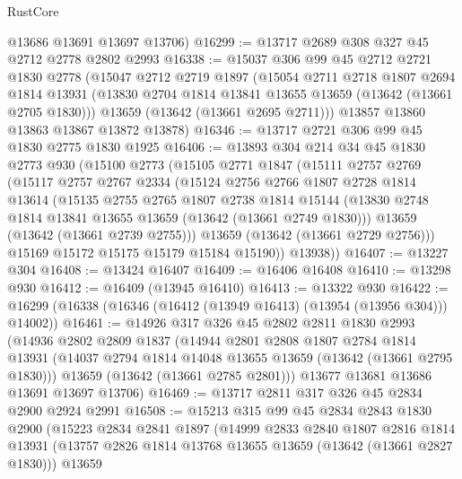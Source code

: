 \begin{lexlean}{RustCore}
\begin{coremodule}
      @13686
      @13691
      @13697
      @13706)
@16299 := @13717 @2689 @308 @327 @45 @2712 @2778 @2802 @2993
@16338 := @15037
    @306
    @99
    @45
    @2712
    @2721
    @1830
    @2778
    (@15047
      @2712
      @2719
      @1897
      (@15054
        @2711
        @2718
        @1807
        @2694
        @1814
        @13931
        (@13830 @2704 @1814 @13841 @13655 @13659 (@13642 (@13661 @2705 @1830)))
        @13659
        (@13642 (@13661 @2695 @2711)))
      @13857
      @13860
      @13863
      @13867
      @13872
      @13878)
@16346 := @13717 @2721 @306 @99 @45 @1830 @2775 @1830 @1925
@16406 := @13893
    @304
    @214
    @34
    @45
    @1830
    @2773
    @930
    (@15100
      @2773
      (@15105
        @2771
        @1847
        (@15111
          @2757
          @2769
          (@15117
            @2757
            @2767
            @2334
            (@15124
              @2756
              @2766
              @1807
              @2728
              @1814
              @13614
              (@15135
                @2755
                @2765
                @1807
                @2738
                @1814
                @15144
                (@13830 @2748 @1814 @13841 @13655 @13659 (@13642 (@13661 @2749 @1830)))
                @13659
                (@13642 (@13661 @2739 @2755)))
              @13659
              (@13642 (@13661 @2729 @2756)))
            @15169
            @15172
            @15175
            @15179
            @15184
            @15190))
        @13938))
@16407 := @13227 @304
@16408 := @13424 @16407
@16409 := @16406 @16408
@16410 := @13298 @930
@16412 := @16409 (@13945 @16410)
@16413 := @13322 @930
@16422 := @16299 (@16338 (@16346 (@16412 (@13949 @16413) (@13954 (@13956 @304))) @14002))
@16461 := @14926
    @317
    @326
    @45
    @2802
    @2811
    @1830
    @2993
    (@14936
      @2802
      @2809
      @1837
      (@14944
        @2801
        @2808
        @1807
        @2784
        @1814
        @13931
        (@14037 @2794 @1814 @14048 @13655 @13659 (@13642 (@13661 @2795 @1830)))
        @13659
        (@13642 (@13661 @2785 @2801)))
      @13677
      @13681
      @13686
      @13691
      @13697
      @13706)
@16469 := @13717 @2811 @317 @326 @45 @2834 @2900 @2924 @2991
@16508 := @15213
    @315
    @99
    @45
    @2834
    @2843
    @1830
    @2900
    (@15223
      @2834
      @2841
      @1897
      (@14999
        @2833
        @2840
        @1807
        @2816
        @1814
        @13931
        (@13757 @2826 @1814 @13768 @13655 @13659 (@13642 (@13661 @2827 @1830)))
        @13659

\end{coremodule}
\end{lexlean}
